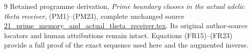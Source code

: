 \documentclass[11pt]{article}
\begin{document}
\begin{thebibliography}{9}
 Retained programme derivation, \emph{Prime boundary classes in the actual adelic theta receiver}, (PM1)--(PM23), complete unchanged source \href{https://github.com/KokunoYumeto/zeta-function-research-reader/blob/44d03e48849934edf59f645cb5021b639ab31ac4/workbenches/splitzero-tandem/continuations/20260923-original-zeta-return/sources/21_prime_memory_and_actual_theta_receiver.tex}{21\_prime\_memory\_and\_actual\_theta\_receiver.tex}. Its original author-source locators and human attributions remain intact. Equations (FR15)--(FR23) provide a full proof of the exact sequence used here and the augmented inverse.
\end{thebibliography}
\end{document}
